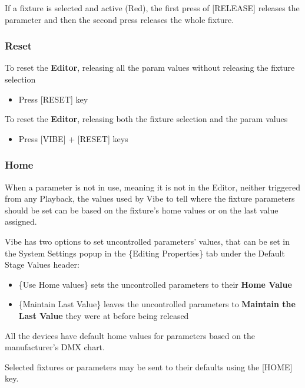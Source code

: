 \documentclass[
]{article}
\providecommand{\tightlist}{%
  \setlength{\itemsep}{0pt}\setlength{\parskip}{0pt}}
\begin{document}
If a fixture is selected and active (Red), the first press of {[}RELEASE{]} releases the parameter and then the second press releases the whole fixture.

\hypertarget{reset}{%
\subsubsection{Reset}\label{reset}}

To reset the \textbf{Editor}, releasing all the param values without releasing the fixture selection

\begin{itemize}
\tightlist
\item
  Press {[}RESET{]} key
\end{itemize}

To reset the \textbf{Editor}, releasing both the fixture selection and the param values

\begin{itemize}
\tightlist
\item
  Press {[}VIBE{]} + {[}RESET{]} keys
\end{itemize}

\hypertarget{home}{%
\subsubsection{Home}\label{home}}

When a parameter is not in use, meaning it is not in the Editor, neither triggered from any Playback, the values used by Vibe to tell where the fixture parameters should be set can be based on the fixture's home values or on the last value assigned.

Vibe has two options to set uncontrolled parameters' values, that can be set in the System Settings popup in the \{Editing Properties\} tab under the Default Stage Values header:

\begin{itemize}
\item
  \{Use Home values\} sets the uncontrolled parameters to their \textbf{Home Value}
\item
  \{Maintain Last Value\} leaves the uncontrolled parameters to \textbf{Maintain the Last Value} they were at before being released
\end{itemize}

All the devices have default home values for parameters based on the manufacturer's DMX chart.

Selected fixtures or parameters may be sent to their defaults using the {[}HOME{]} key.
\end{document}
